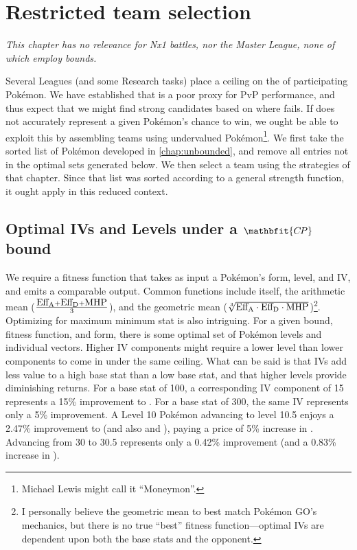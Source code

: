 \chapter{Restricted team selection\label{chap:bounded}}
\textit{This chapter has no relevance for Nx1 battles, nor the Master
  League, none of which employ \CP{} bounds.}
\bigskip

Several Leagues (and some Research tasks) place a ceiling on the \CP{} of
 participating Pokémon.
We have established that \CP{} is a poor proxy for PvP performance, and thus
 expect that we might find strong candidates based on where \CP{} fails.
If \CP{} does not accurately represent a given Pokémon's chance to win, we ought
 be able to exploit this by assembling teams using undervalued Pokémon\footnote{Michael Lewis might call it ``Moneymon''.}.
We first take the sorted list of Pokémon developed in \autoref{chap:unbounded},
 and remove all entries not in the optimal sets generated below.
We then select a team using the strategies of that chapter. Since
 that list was sorted according to a general strength function, it
 ought apply in this reduced context.

\section[Optimal IVs and Levels under a \CP{} bound]%
{Optimal IVs and Levels under a $\mathbfit{C\kern -1ptP}$\, bound}
We require a fitness function that takes as input a Pokémon's form, level, and IV,
  and emits a comparable output.
  Common functions include \CP{} itself, the arithmetic mean ($\frac{\mbox{$\text{Eff}_\text{A}$} + \mbox{$\text{Eff}_\text{D}$} + \mbox{MHP}}{3}$),
  and the geometric mean ($\sqrt[3]{\mbox{$\text{Eff}_\text{A}$} \cdot \mbox{$\text{Eff}_\text{D}$} \cdot \mbox{MHP}}$)\footnote{I personally believe the geometric mean to best match Pokémon GO's
  mechanics, but there is no true ``best'' fitness function---optimal IVs are
  dependent upon both the base stats and the opponent.}.
Optimizing for maximum minimum stat is also intriguing.
For a given \CP{} bound, fitness function, and form, there is some optimal set of Pokémon levels
 and individual vectors.
Higher IV components might require a lower level than lower components to
 come in under the same ceiling.
What can be said is that IVs add less value to a high base stat than a low
 base stat, and that higher levels provide diminishing returns.
For a base stat of 100, a corresponding IV component of 15 represents a
 15\% improvement to .
For a base stat of 300, the same IV represents only a 5\% improvement.
A Level 10 Pokémon advancing to level 10.5 enjoys a 2.47\% improvement to
  (and also  and ), paying a price of 5\% increase
 in \CP{}.
Advancing from 30 to 30.5 represents only a 0.42\% improvement (and a
 0.83\% increase in \CP{}).

